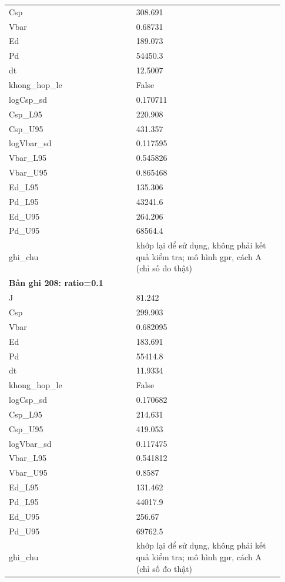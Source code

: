 \begin{longtable}{p{0.43\linewidth}p{0.50\linewidth}}
Csp & 308.691 \\
Vbar & 0.68731 \\
Ed & 189.073 \\
Pd & 54450.3 \\
dt & 12.5007 \\
khong\_\allowbreak hop\_\allowbreak le & False \\
logCsp\_\allowbreak sd & 0.170711 \\
Csp\_\allowbreak L95 & 220.908 \\
Csp\_\allowbreak U95 & 431.357 \\
logVbar\_\allowbreak sd & 0.117595 \\
Vbar\_\allowbreak L95 & 0.545826 \\
Vbar\_\allowbreak U95 & 0.865468 \\
Ed\_\allowbreak L95 & 135.306 \\
Pd\_\allowbreak L95 & 43241.6 \\
Ed\_\allowbreak U95 & 264.206 \\
Pd\_\allowbreak U95 & 68564.4 \\
ghi\_\allowbreak chu & khớp lại để sử dụng, không phải kết quả kiểm tra; mô hình gpr, cách A (chỉ số đo thật) \\
\midrule
\multicolumn{2}{p{0.95\linewidth}}{\textbf{Bản ghi 208: ratio=0.1}} \\
J & 81.242 \\
Csp & 299.903 \\
Vbar & 0.682095 \\
Ed & 183.691 \\
Pd & 55414.8 \\
dt & 11.9334 \\
khong\_\allowbreak hop\_\allowbreak le & False \\
logCsp\_\allowbreak sd & 0.170682 \\
Csp\_\allowbreak L95 & 214.631 \\
Csp\_\allowbreak U95 & 419.053 \\
logVbar\_\allowbreak sd & 0.117475 \\
Vbar\_\allowbreak L95 & 0.541812 \\
Vbar\_\allowbreak U95 & 0.8587 \\
Ed\_\allowbreak L95 & 131.462 \\
Pd\_\allowbreak L95 & 44017.9 \\
Ed\_\allowbreak U95 & 256.67 \\
Pd\_\allowbreak U95 & 69762.5 \\
ghi\_\allowbreak chu & khớp lại để sử dụng, không phải kết quả kiểm tra; mô hình gpr, cách A (chỉ số đo thật) \\

\end{longtable}
